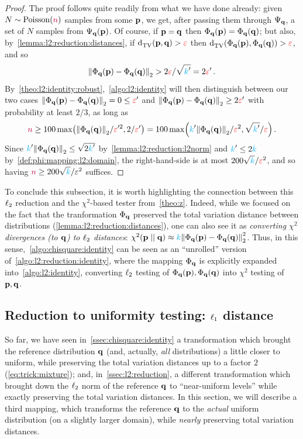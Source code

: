 \begin{proof}
The proof follows quite readily from what we have done already: given $N\sim \poisson{\ns}$ \iid samples from some $\p$, we get, after passing them through $\Psi_\q$, a set of $N$ \iid samples from $\Psi_\q(\p)$. Of course, if $\p=\q$ then $\Phi_\q(\p)=\Phi_\q(\q)$; but also, by~\cref{lemma:l2:reduction:distances}, if $\totalvardist{\p}{\q}>\dst$ then $\totalvardist{\Phi_\q(\p)}{\Phi_\q(\q)}>\dst$, and so 
\[
	\normtwo{\Phi_\q(\p) - \Phi_\q(\q) } > 2\dst/\sqrt{\ab'} = 2\dst'\,.
\]
By~\cref{theo:l2:identity:robust},~\cref{algo:l2:identity} will then distinguish between our two cases $\normtwo{\Phi_\q(\p) - \Phi_\q(\q) } = 0 \leq \dst'$ and $\normtwo{\Phi_\q(\p) - \Phi_\q(\q) } \geq 2\dst'$ with probability at least $2/3$, as long as 
\[
	\ns \geq 100\max\Paren{\normtwo{\Phi_\q(\q)}/\dst'^2, 2/\dst'} = 100\max\Paren{\ab'\normtwo{\Phi_\q(\q)}/\dst^2, \sqrt{\ab'}/\dst}\,.
\]
Since $\ab'\normtwo{\Phi_\q(\q)} \leq \sqrt{2\ab'}$ by~\cref{lemma:l2:reduction:l2norm} and $\ab'\leq 2\ab$ by~\cref{def:phi:mapping:l2:domain}, the right-hand-side is at most $200\sqrt{\ab}/\dst^2$, and so having $\ns \geq 200\sqrt{\ab}/\eps^2$ suffices.
\end{proof}
To conclude this subsection, it is worth highlighting the connection between this $\lp[2]$ reduction and the $\chi^2$-based tester from~\cref{theo:z}. Indeed, while we focused on the fact that the tranformation $\Phi_\q$ preserved the total variation distance between distributions (\cref{lemma:l2:reduction:distances}), one can also see it as \emph{converting $\chi^2$ divergences (to $\q$) to $\lp[2]$ distances}: $\chisquare{\p}{\q}\approx \ab\normtwo{\Phi_\q(\p)-\Phi_\q(\q)}^2$. Thus, in this sense,~\cref{algo:chisquare:identity} can be seen as an ``unrolled'' version of~\cref{algo:l2:reduction:identity}, where the mapping $\Phi_\q$ is explicitly expanded into~\cref{algo:l2:identity}, converting $\lp[2]$ testing of $\Phi_\q(\p),\Phi_\q(\q)$ into $\chi^2$ testing of $\p,\q$.

\subsection{Reduction to uniformity testing: $\lp[1]$ distance}
	\label{ssec:l1:reduction}
So far, we have seen in~\cref{ssec:chisquare:identity} a transformation which brought the reference distribution $\q$ (and, actually, \emph{all} distributions) a little closer to uniform, while preserving the total variation distances up to a factor $2$ (\cref{eq:trick:mixture}); and, in~\cref{ssec:l2:reduction}, a different transformation which brought down the $\lp[2]$ norm of the reference $\q$ to ``near-uniform levels'' while exactly preserving the total variation distances. In this section, we will describe a third mapping, which transforms the reference $\q$ to the \emph{actual} uniform distribution (on a slightly larger domain), while \emph{nearly} preserving total variation distances.

